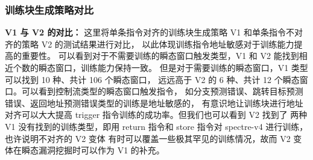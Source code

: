 \begin{table}[h!]
    \begin{center} 
    \caption{V3 瞬态窗口统计} 
    \label{table:v3-trans}  
    \end{center}
\end{table}

\subsubsection{训练块生成策略对比}

\textbf{V1 与 V2 的对比：}
这里将单条指令对齐的训练块生成策略 V1 和单条指令不对齐的策略 V2 的测试结果进行对比，
以此体现训练指令地址敏感对于训练能力提高的重要性。
可以看到对于不需要训练的瞬态窗口触发类型，V1 和 V2 能找到相近个数的瞬态窗口，训练能力保持一致。
但是对于需要训练的瞬态窗口，V1 类型可以找到 10 种、共计 106 个瞬态窗口，
远远高于 V2 的 6 种、共计 12 个瞬态窗口。可以看到控制流类型的瞬态窗口触发指令，
如分支预测错误、跳转目标预测错误、返回地址预测错误类型的训练是地址敏感的，
有意识地让训练块进行地址对齐可以大大提高 trigger 指令训练的成功率。但我们也可以看到 V2 找到了
两种 V1 没有找到的训练类型，即用 return 指令和 store 指令对 spectre-v4 进行训练，也许说明不对齐的 V2 变体
有时可以覆盖一些极其罕见的训练情况，故而 V2 变体在瞬态漏洞挖掘时可以作为 V1 的补充。\par

